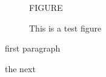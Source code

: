 \documentclass{article}
\makeatletter
\newif\ifafterpar
\def\afterparnoindent{%
   \afterpartrue
   \everypar{%
     \ifafterpar
       \afterparfalse
       {\setbox\z@\lastbox}%
     \else
       \everypar{}%
     \fi}}
\renewcommand\afterparnoindent{\par\@doendpe}
\makeatother
\begin{document}
 \lipsum[1]

\begin{figure}


FIGURE
\caption{This is a test figure}\afterparnoindent
\end{figure}
 first paragraph \lipsum[1]

 the next \lipsum[1]

 
\end{document}
